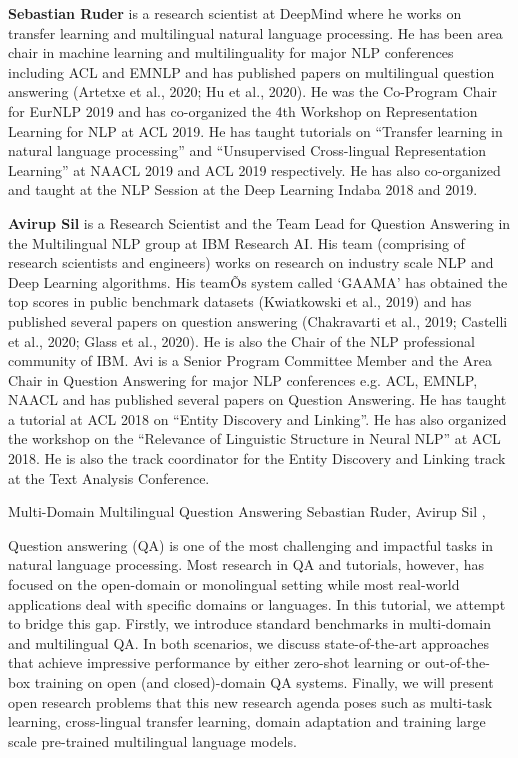 \begin{bio}
  {\bfseries Sebastian Ruder} is a research scientist at DeepMind where he works on transfer learning and multilingual natural language processing. He has been area chair in machine learning and multilinguality for major NLP conferences including ACL and EMNLP and has published papers on multilingual question answering (Artetxe et al., 2020; Hu et al., 2020). He was the Co-Program Chair for EurNLP 2019 and has co-organized the 4th Workshop on Representation Learning for NLP at ACL 2019. He has taught tutorials on ``Transfer learning in natural language processing'' and ``Unsupervised Cross-lingual Representation Learning'' at NAACL 2019 and ACL 2019 respectively. He has also co-organized and taught at the NLP Session at the Deep Learning Indaba 2018 and 2019.

  {\bfseries Avirup Sil} is a Research Scientist and the Team Lead for Question Answering in the Multilingual NLP group at IBM Research AI. His team (comprising of research scientists and engineers) works on research on industry scale NLP and Deep Learning algorithms. His teamÕs system called `GAAMA' has obtained the top scores in public benchmark datasets (Kwiatkowski et al., 2019) and has published several papers on question answering (Chakravarti et al., 2019; Castelli et al., 2020; Glass et al., 2020). He is also the Chair of the NLP professional community of IBM. Avi is a Senior Program Committee Member and the Area Chair in Question Answering for major NLP conferences e.g. ACL, EMNLP, NAACL and has published several papers on Question Answering. He has taught a tutorial at ACL 2018 on ``Entity Discovery and Linking''. He has also organized the workshop on the ``Relevance of Linguistic Structure in Neural NLP'' at ACL 2018. He is also the track coordinator for the Entity Discovery and Linking track at the Text Analysis Conference.

\end{bio}

\begin{tutorial}
  {Multi-Domain Multilingual Question Answering}
  {Sebastian Ruder, Avirup Sil}
  {\daydateyear, \tutorialmorningtime}


Question answering (QA) is one of the most challenging and impactful tasks in natural language processing. Most research in QA and tutorials, however, has focused on the open-domain or monolingual setting while most real-world applications deal with specific domains or languages. In this tutorial, we attempt to bridge this gap. Firstly, we introduce standard benchmarks in multi-domain and multilingual QA. In both scenarios, we discuss state-of-the-art approaches that achieve impressive performance by either zero-shot learning or out-of-the-box training on open (and closed)-domain QA systems. Finally, we will present open research problems that this new research agenda poses such as multi-task learning, cross-lingual transfer learning, domain adaptation and training large scale pre-trained multilingual language models.

\end{tutorial}
